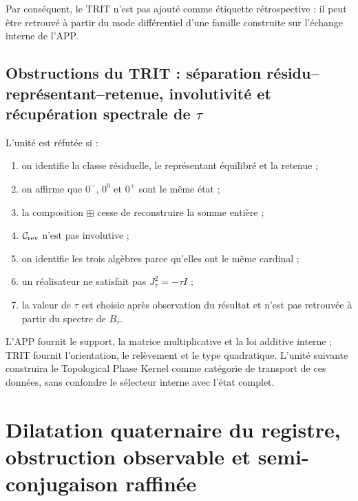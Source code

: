 Par conséquent, le TRIT n’est pas ajouté comme étiquette rétrospective : il peut être retrouvé
à partir du mode différentiel d’une famille construite sur l’échange interne
de l’APP.

\subsection{Obstructions du TRIT : séparation résidu–représentant–retenue, involutivité et récupération spectrale de \(\tau\)}

\begin{criterion}
L’unité est réfutée si :
\begin{enumerate}
 \item on identifie la classe résiduelle, le représentant équilibré et la retenue ;
 \item on affirme que \(0^-\), \(0^0\) et \(0^+\) sont le même état ;
 \item la composition \(\boxplus\) cesse de reconstruire la somme entière ;
 \item \(\mathcal C_{\rm rev}\) n’est pas involutive ;
 \item on identifie les trois algèbres parce qu’elles ont le même cardinal ;
 \item un réalisateur ne satisfait pas \(J_\tau^2=-\tau I\) ;
 \item la valeur de \(\tau\) est choisie après observation du résultat et n’est pas
       retrouvée à partir du spectre de \(B_\tau\).
\end{enumerate}
\end{criterion}

L’APP fournit le support, la matrice multiplicative et la loi additive
interne ; TRIT fournit l’orientation,
le relèvement et le type quadratique. L’unité suivante construira le
Topological Phase Kernel comme catégorie de transport de ces données, sans
confondre le sélecteur interne avec l’état complet.

\HMTDeferredTPKBase
\HMTDeferredTPKDevelopment



\section{Dilatation quaternaire du registre, obstruction observable et semi-conjugaison raffinée}
\label{p12-83-c1-s12:chap:dilatacion-cuaternaria-semiconjugacion}

